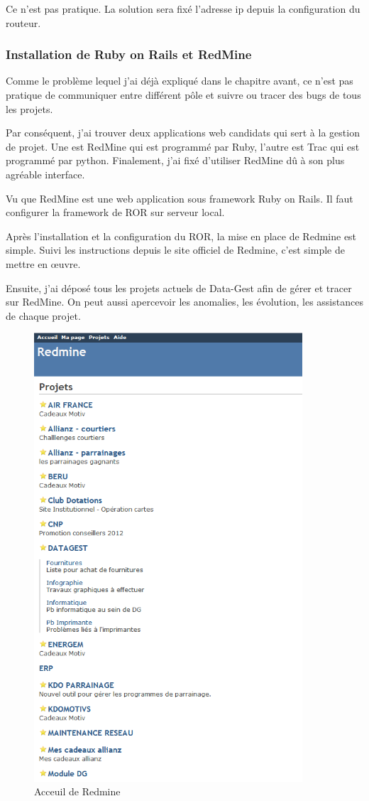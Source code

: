 Ce n'est pas pratique. La solution sera fixé l'adresse ip depuis la configuration du routeur.



\subsubsection{Installation de Ruby on Rails et RedMine}
Comme le problème lequel j'ai déjà expliqué dans le chapitre avant, ce n'est pas pratique de communiquer entre différent pôle  et suivre ou tracer des bugs de tous les projets. 

Par conséquent, j'ai trouver deux applications web candidats qui sert à la gestion de projet. Une est RedMine qui est programmé par Ruby, l'autre est Trac qui est programmé par python. Finalement, j'ai fixé d'utiliser RedMine dû à son plus agréable interface.  

Vu que RedMine est une web application sous framework Ruby on Rails. Il faut configurer la framework de ROR sur serveur local. 

Après l'installation et la configuration du ROR, la mise en place de Redmine est simple. Suivi les instructions depuis le site officiel de Redmine, c'est simple de mettre en œuvre. 

Ensuite, j'ai déposé tous les projets actuels de Data-Gest afin de gérer et tracer sur RedMine. On peut aussi apercevoir les anomalies, les évolution, les assistances de chaque projet.
\begin{figure}[hbtp]
\center
\includegraphics[width=10cm]{body/images/redmine-accueil.PNG}
\caption{Acceuil de Redmine}
\end{figure}



